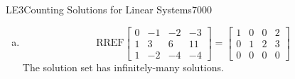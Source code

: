 \begin{exercise}{LE3}{Counting Solutions for Linear Systems}{7000}
\begin{exerciseAnswer}
\begin{enumerate}[(a)]
 
\item  

 \[\mathrm{RREF}\left[\begin{array}{ccc|c}
0 & -1 & -2 & -3 \\
1 & 3 & 6 & 11 \\
1 & -2 & -4 & -4
\end{array}\right]=\left[\begin{array}{ccc|c}
1 & 0 & 0 & 2 \\
0 & 1 & 2 & 3 \\
0 & 0 & 0 & 0
\end{array}\right]\] The solution set has infinitely-many solutions. 

 
\end{enumerate}

     \end{exerciseAnswer}
 \end{exercise}


